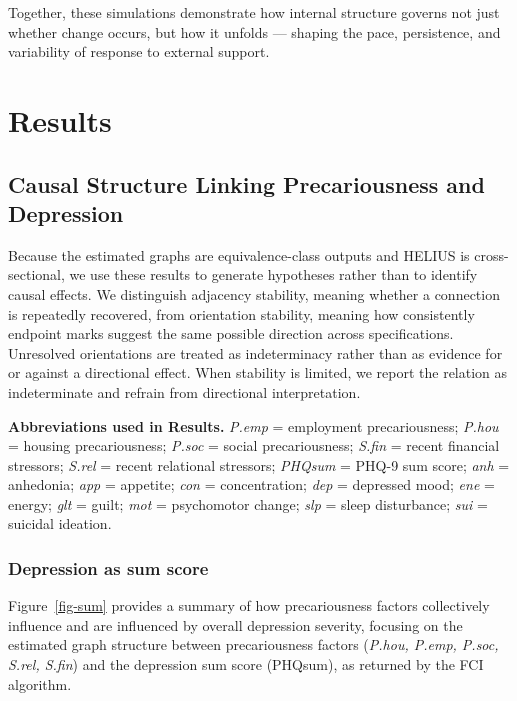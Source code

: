 \documentclass[
]{article}
\begin{document}
Together, these simulations demonstrate how internal structure governs
not just whether change occurs, but how it unfolds --- shaping the pace,
persistence, and variability of response to external support.

\section{Results}\label{results}

\subsection{Causal Structure Linking Precariousness and
Depression}\label{causal-structure-linking-precariousness-and-depression}

Because the estimated graphs are equivalence-class outputs and HELIUS is
cross-sectional, we use these results to generate hypotheses rather than
to identify causal effects. We distinguish adjacency stability, meaning
whether a connection is repeatedly recovered, from orientation
stability, meaning how consistently endpoint marks suggest the same
possible direction across specifications. Unresolved orientations are
treated as indeterminacy rather than as evidence for or against a
directional effect. When stability is limited, we report the relation as
indeterminate and refrain from directional interpretation.

\begin{abbrbox}
\textbf{Abbreviations used in Results.}
\emph{P.emp} = employment precariousness; \emph{P.hou} = housing precariousness; \emph{P.soc} = social precariousness; \emph{S.fin} = recent financial stressors; \emph{S.rel} = recent relational stressors; \emph{PHQsum} = PHQ-9 sum score; \emph{anh} = anhedonia; \emph{app} = appetite; \emph{con} = concentration; \emph{dep} = depressed mood; \emph{ene} = energy; \emph{glt} = guilt; \emph{mot} = psychomotor change; \emph{slp} = sleep disturbance; \emph{sui} = suicidal ideation.
\end{abbrbox}

\subsubsection{Depression as sum score}\label{depression-as-sum-score}

Figure~\ref{fig-sum} provides a summary of how precariousness factors
collectively influence and are influenced by overall depression
severity, focusing on the estimated graph structure between
precariousness factors (\textit{P.hou, P.emp, P.soc, S.rel, S.fin}) and
the depression sum score (PHQsum), as returned by the FCI algorithm.
\end{document}
